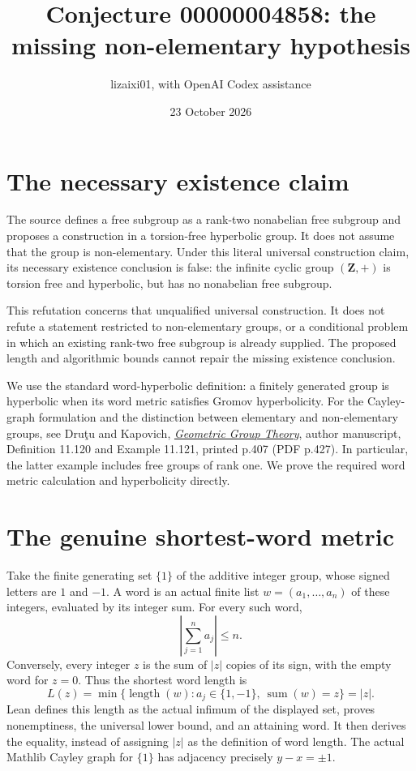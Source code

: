 \documentclass[11pt]{article}
\title{Conjecture 00000004858: the missing non-elementary hypothesis}
\author{lizaixi01, with OpenAI Codex assistance}
\date{23 October 2026}
\begin{document}
\maketitle
\section{The necessary existence claim}
The source defines a free subgroup as a rank-two nonabelian free subgroup
and proposes a construction in a torsion-free hyperbolic group. It does
not assume that the group is non-elementary. Under this literal universal
construction claim, its necessary existence conclusion is false:
the infinite cyclic group $(\mathbf Z,+)$ is torsion free and hyperbolic,
but has no nonabelian free subgroup.

This refutation concerns that unqualified universal construction. It
does not refute a statement restricted to non-elementary groups, or a
conditional problem in which an existing rank-two free subgroup is
already supplied. The proposed length and algorithmic bounds cannot
repair the missing existence conclusion.

We use the standard word-hyperbolic definition: a finitely generated
group is hyperbolic when its word metric satisfies Gromov hyperbolicity.
For the Cayley-graph formulation and the distinction between elementary
and non-elementary groups, see Dru\c{t}u and Kapovich,
\href{https://www.math.ucdavis.edu/~kapovich/EPR/ggt.pdf}
{\emph{Geometric Group Theory}}, author manuscript, Definition 11.120
and Example 11.121, printed p.407 (PDF p.427). In particular, the latter
example includes free groups of rank one. We prove the required word
metric calculation and hyperbolicity directly.

\section{The genuine shortest-word metric}
Take the finite generating set $\{1\}$ of the additive integer group,
whose signed letters are $1$ and $-1$. A word is an actual finite list
$w=(a_1,\ldots,a_n)$ of these integers, evaluated by its integer sum.
For every such word,
\[
 \left|\sum_{j=1}^n a_j\right|\le n.
\]
Conversely, every integer $z$ is the sum of $|z|$ copies of its sign,
with the empty word for $z=0$. Thus the shortest word length is
\[
 L(z)=\min\{\operatorname{length}(w):
       a_j\in\{1,-1\},\ \operatorname{sum}(w)=z\}=|z|.
\]
Lean defines this length as the actual infimum of the displayed set,
proves nonemptiness, the universal lower bound, and an attaining word.
It then derives the equality, instead of assigning $|z|$ as the
definition of word length. The actual Mathlib Cayley graph for $\{1\}$
has adjacency precisely $y-x=\pm1$.
\end{document}
